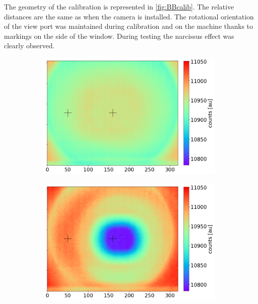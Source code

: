 The geometry of the calibration is represented in \autoref{fig:BBcalib}. The relative distances are the same as when the camera is installed. The rotational orientation of the view port was maintained during calibration and on the machine thanks to markings on the side of the window. During testing the narcissus effect was clearly observed.

\begin{figure}[!ht]
     \centering
     \begin{subfigure}{0.435\linewidth}
         \centering
         \includegraphics[trim={5 0 130 5},clip,width=\linewidth]{Chapters/chapter2/figs/NUC_calib2.png}
         \caption{}
         \label{NUC_calib2}
     \end{subfigure}
     \begin{subfigure}{0.535\linewidth}
         \centering
         \includegraphics[trim={5 0 5 5},clip,width=\linewidth]{Chapters/chapter2/figs/NUC_calib1.png}

\end{subfigure}
\end{figure}
